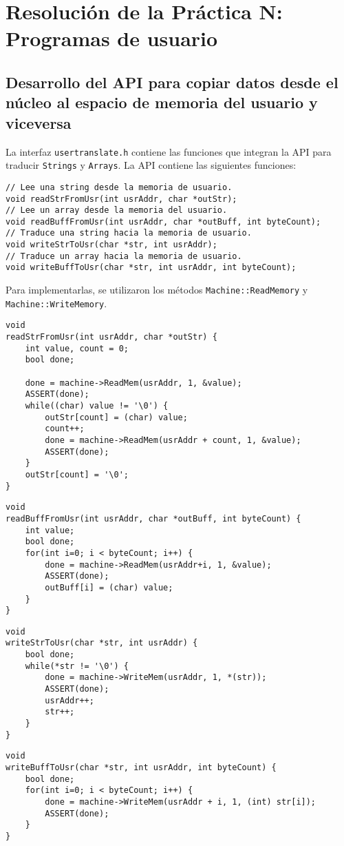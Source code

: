 \chapter{Resolución de la Práctica N: Programas de usuario}
\section{Desarrollo del API para copiar datos desde el núcleo al espacio de memoria del usuario y viceversa}
La interfaz \texttt{usertranslate.h} contiene las funciones que integran la API para traducir \texttt{Strings} y \texttt{Arrays}. La API contiene las siguientes funciones:
\begin{lstlisting}[style=C]
// Lee una string desde la memoria de usuario.
void readStrFromUsr(int usrAddr, char *outStr);
// Lee un array desde la memoria del usuario.
void readBuffFromUsr(int usrAddr, char *outBuff, int byteCount);
// Traduce una string hacia la memoria de usuario.
void writeStrToUsr(char *str, int usrAddr);
// Traduce un array hacia la memoria de usuario.
void writeBuffToUsr(char *str, int usrAddr, int byteCount);
\end{lstlisting}
Para implementarlas, se utilizaron los métodos \texttt{Machine::ReadMemory} y \texttt{Machine::WriteMemory}.
\begin{lstlisting}[style=C]
void
readStrFromUsr(int usrAddr, char *outStr) {
    int value, count = 0;
    bool done;
   
    done = machine->ReadMem(usrAddr, 1, &value);
    ASSERT(done);
    while((char) value != '\0') {
        outStr[count] = (char) value;
        count++;
        done = machine->ReadMem(usrAddr + count, 1, &value);
        ASSERT(done);
    }
    outStr[count] = '\0';
}
\end{lstlisting}
\begin{lstlisting}[style=C]
void
readBuffFromUsr(int usrAddr, char *outBuff, int byteCount) {
    int value;
    bool done;
    for(int i=0; i < byteCount; i++) {
        done = machine->ReadMem(usrAddr+i, 1, &value);
        ASSERT(done);
        outBuff[i] = (char) value;
    }
}
\end{lstlisting}
\begin{lstlisting}[style=C]
void
writeStrToUsr(char *str, int usrAddr) {
    bool done;
    while(*str != '\0') {
        done = machine->WriteMem(usrAddr, 1, *(str));
        ASSERT(done);
        usrAddr++;
        str++;
    }
}
\end{lstlisting}
\begin{lstlisting}[style=C]
void
writeBuffToUsr(char *str, int usrAddr, int byteCount) {
    bool done;
    for(int i=0; i < byteCount; i++) {
        done = machine->WriteMem(usrAddr + i, 1, (int) str[i]);
        ASSERT(done);
    }
}
\end{lstlisting}
